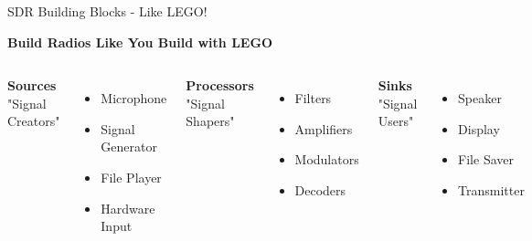 \documentclass[aspectratio=169,11pt]{beamer}
\begin{document}
\begin{frame}{SDR Building Blocks - Like LEGO!}
\begin{center}
\Large\textbf{Build Radios Like You Build with LEGO}
\end{center}
\vspace{1em}
\begin{columns}
\begin{center}
\textcolor{radioblue}{\textbf{Sources}}\\
"Signal Creators"
\end{center}
\begin{itemize}
    \item Microphone
    \item Signal Generator
    \item File Player
    \item Hardware Input
\end{itemize}

\begin{center}
\textcolor{radiogreen}{\textbf{Processors}}\\
"Signal Shapers"
\end{center}
\begin{itemize}
    \item Filters
    \item Amplifiers
    \item Modulators
    \item Decoders
\end{itemize}

\begin{center}
\textcolor{radioorange}{\textbf{Sinks}}\\
"Signal Users"
\end{center}
\begin{itemize}
    \item Speaker
    \item Display
    \item File Saver
    \item Transmitter
\end{itemize}
\end{columns}
\vspace{1em}
\end{frame}
\end{document}
